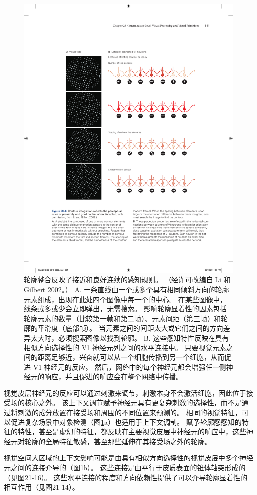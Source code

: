 \begin{figure}[htbp]
	\centering
	\includegraphics[width=0.75\linewidth]{chap23/fig_23_6}
	\caption{轮廓整合反映了接近和良好连续的感知规则。 （经许可改编自 Li 和 Gilbert 2002。） A. 一条直线由一个或多个具有相同倾斜方向的轮廓元素组成，出现在此处四个图像中每一个的中心。 在某些图像中，线条或多或少会立即弹出，无需搜索。 影响轮廓显着性的因素包括轮廓元素的数量（比较第一帧和第二帧）、元素间距（第三帧）和轮廓的平滑度（底部帧）。 当元素之间的间距太大或它们之间的方向差异太大时，必须搜索图像以找到轮廓。 B. 这些感知特性反映在具有相似方向选择性的 V1 神经元列之间的水平连接中。 只要视觉元素之间的距离足够近，兴奋就可以从一个细胞传播到另一个细胞，从而促进 V1 神经元的反应。 然后，网络中的每个神经元都会增强任一侧神经元的响应，并且促进的响应会在整个网络中传播。}
	\label{fig:23_6}
\end{figure}


视觉皮层神经元的反应可以通过刺激来调节，刺激本身不会激活细胞，因此位于接受场的核心之外。 
该上下文调节赋予神经元具有更复杂刺激的选择性，而不是通过将刺激的成分放置在接受场和周围的不同位置来预测的。 
相同的视觉特征，可以促进复杂场景中对象检测（图\ref{fig:23_6}a）也适用于上下文调制。 
赋予轮廓感感知的特征的特性，甚至是虚幻的特征，都反映在主要视觉皮层中神经元的响应中，这些神经元对轮廓的全局特征敏感，甚至那些延伸在其接受场之外的轮廓。


视觉空间大区域的上下文影响可能是由具有相似方向选择性的视觉皮层中多个神经元之间的连接介导的（图\ref{fig:23_6}b）。 
这些连接是由平行于皮质表面的锥体轴突形成的（见图21-16）。 
这些水平连接的程度和方向依赖性提供了可以介导轮廓显着性的相互作用（见图21-14）。


